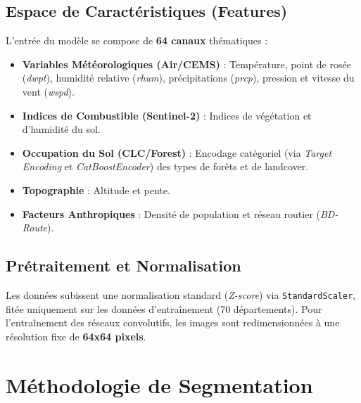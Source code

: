 \documentclass[11pt,a4paper]{article}
\begin{document}
\subsection{Espace de Caractéristiques (Features)}
L'entrée du modèle se compose de \textbf{64 canaux} thématiques :
\begin{itemize}
    \item \textbf{Variables Météorologiques (Air/CEMS)} : Température, point de rosée (\textit{dwpt}), humidité relative (\textit{rhum}), précipitations (\textit{prcp}), pression et vitesse du vent (\textit{wspd}).
    \item \textbf{Indices de Combustible (Sentinel-2)} : Indices de végétation et d'humidité du sol.
    \item \textbf{Occupation du Sol (CLC/Forest)} : Encodage catégoriel (via \textit{Target Encoding} et \textit{CatBoostEncoder}) des types de forêts et de landcover.
    \item \textbf{Topographie} : Altitude et pente.
    \item \textbf{Facteurs Anthropiques} : Densité de population et réseau routier (\textit{BD-Route}).
\end{itemize}

\subsection{Prétraitement et Normalisation}
Les données subissent une normalisation standard (\textit{Z-score}) via \texttt{StandardScaler}, fitée uniquement sur les données d'entraînement (70 départements). Pour l'entraînement des réseaux convolutifs, les images sont redimensionnées à une résolution fixe de \textbf{64x64 pixels}.

\section{Méthodologie de Segmentation}
\end{document}
